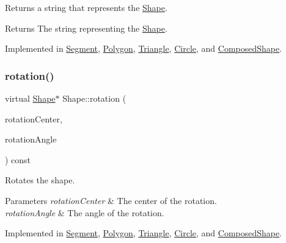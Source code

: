 Returns a string that represents the \hyperlink{class_shape}{Shape}. \begin{DoxyReturn}{Returns}
The string representing the \hyperlink{class_shape}{Shape}. 
\end{DoxyReturn}


Implemented in \hyperlink{class_segment_a28b3be893a35a0d73574354752c147fd}{Segment}, \hyperlink{class_polygon_a41c29b75f2463646af0f7bd604a4853d}{Polygon}, \hyperlink{class_triangle_acd8612cc20ffb71e543944c869e4ab81}{Triangle}, \hyperlink{class_circle_a4533a225b6d02699cea4045f47d3c7ff}{Circle}, and \hyperlink{class_composed_shape_aef491963b0e58209d1921973f2711c94}{Composed\+Shape}.

\hypertarget{class_shape_abfc7a673b8a6d9a4d646dc15c771aa0d}{}\label{class_shape_abfc7a673b8a6d9a4d646dc15c771aa0d} 
\subsubsection{\texorpdfstring{rotation()}{rotation()}}
{\footnotesize\ttfamily virtual \hyperlink{class_shape}{Shape}$\ast$ Shape\+::rotation (\begin{DoxyParamCaption}\item[{const \hyperlink{class_vector2_d}{Vector2D} \&}]{rotation\+Center,  }\item[{const \hyperlink{class_radian_angle}{Radian\+Angle} \&}]{rotation\+Angle }\end{DoxyParamCaption}) const\hspace{0.3cm}{\ttfamily [pure virtual]}}

Rotates the shape. 
\begin{DoxyParams}{Parameters}
{\em rotation\+Center} & The center of the rotation. \\
\hline
{\em rotation\+Angle} & The angle of the rotation. \\
\hline
\end{DoxyParams}


Implemented in \hyperlink{class_segment_a46c1007c530f9be37ee7637e4ffdbf57}{Segment}, \hyperlink{class_polygon_a5a453f01700f97ca98b0487cd670b194}{Polygon}, \hyperlink{class_triangle_a663ca3c6bd7967265849bf1f8c8a464b}{Triangle}, \hyperlink{class_circle_ac676105f9868877ffcecc9c236de10bb}{Circle}, and \hyperlink{class_composed_shape_a9c4f0561d631b20c6cd56348d41a14dd}{Composed\+Shape}.

\hypertarget{class_shape_ae1477829e1b06aad805b8b76312f87bc}{}\label{class_shape_ae1477829e1b06aad805b8b76312f87bc} 
